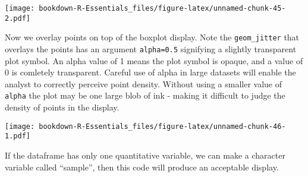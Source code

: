 \documentclass[]{book}
\newenvironment{Shaded}{\begin{snugshade}}{\end{snugshade}}
\newcommand{\KeywordTok}[1]{\textcolor[rgb]{0.13,0.29,0.53}{\textbf{#1}}}
\newcommand{\DataTypeTok}[1]{\textcolor[rgb]{0.13,0.29,0.53}{#1}}
\newcommand{\DecValTok}[1]{\textcolor[rgb]{0.00,0.00,0.81}{#1}}
\newcommand{\FloatTok}[1]{\textcolor[rgb]{0.00,0.00,0.81}{#1}}
\newcommand{\StringTok}[1]{\textcolor[rgb]{0.31,0.60,0.02}{#1}}
\newcommand{\CommentTok}[1]{\textcolor[rgb]{0.56,0.35,0.01}{\textit{#1}}}
\newcommand{\OtherTok}[1]{\textcolor[rgb]{0.56,0.35,0.01}{#1}}
\newcommand{\OperatorTok}[1]{\textcolor[rgb]{0.81,0.36,0.00}{\textbf{#1}}}
\newcommand{\NormalTok}[1]{#1}
\begin{document}
\texttt{[image: bookdown-R-Essentials\_files/figure-latex/unnamed-chunk-45-2.pdf]}

Now we overlay points on top of the boxplot display. Note the
\texttt{geom\_jitter} that overlays the points has an argument
\texttt{alpha=0.5} signifying a slightly transparent plot symbol. An
alpha value of 1 means the plot symbol is opaque, and a value of 0 is
comletely transparent. Careful use of alpha in large datasets will
enable the analyst to correctly perceive point density. Without using a
smaller value of \texttt{alpha} the plot may be one large blob of ink -
making it difficult to judge the density of points in the display.

\begin{Shaded}
\end{Shaded}

\texttt{[image: bookdown-R-Essentials\_files/figure-latex/unnamed-chunk-46-1.pdf]}

If the dataframe has only one quantitative variable, we can make a
character variable called ``sample'', then this code will produce an
acceptable display.

\begin{Shaded}
\end{Shaded}
\end{document}
